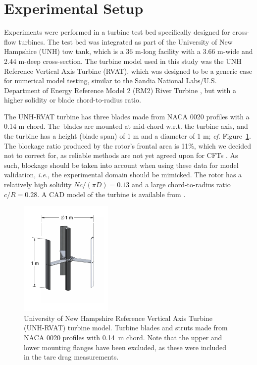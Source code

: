 \documentclass[energies,article,accept,moreauthors,pdftex,10pt,a4paper]{mdpi}
\theoremstyle{mdpi}
\newcounter{ex}
\newcounter{re}
\begin{document}
\section{Experimental Setup}

Experiments were performed in a turbine test bed specifically designed for
cross-flow turbines. The test bed was integrated as part of the University of
New Hampshire (UNH) tow tank, which is a 36 m-long facility with a 3.66 m-wide
and 2.44 m-deep cross-section. The turbine model used in this study was the UNH
Reference Vertical Axis Turbine (RVAT), which was designed to be a generic case
for numerical model testing, similar to the Sandia National Labs/U.S. Department
of Energy Reference Model 2 (RM2) River Turbine \cite{Neary2014}, but with a
higher solidity or blade chord-to-radius ratio.


The UNH-RVAT turbine has three blades made from NACA 0020 profiles with a 0.14 m
chord. The~blades are mounted at mid-chord w.r.t. the turbine axis, and the
turbine has a height (blade span) of 1 m and a diameter of 1 m; \textit{cf}.
Figure~\ref{fig:turbine}. The blockage ratio produced by the rotor's frontal
area is 11\%, which we decided not to correct for, as reliable methods are not
yet agreed upon for CFTs \cite{Cavagnaro2014}. As such, blockage should be taken
into account when using these data for model validation, \emph{i.e.}, the
experimental domain should be mimicked. The rotor has a relatively high solidity
$Nc/(\pi D) = 0.13$ and a large chord-to-radius ratio $c/R = 0.28$. A CAD model
of the turbine is available from \cite{Bachant2014-RVAT-CAD}.

\begin{figure}[H]
\centering

\includegraphics[width=0.4\textwidth]{figures/turbine}

\caption{University of New Hampshire Reference Vertical Axis Turbine (UNH-RVAT)
    turbine model. Turbine blades and struts made from NACA 0020 profiles with
    0.14~m chord. Note that the upper and lower mounting flanges have been excluded,
    as these were included in the tare drag measurements.}

\label{fig:turbine}
\end{figure}
\end{document}
